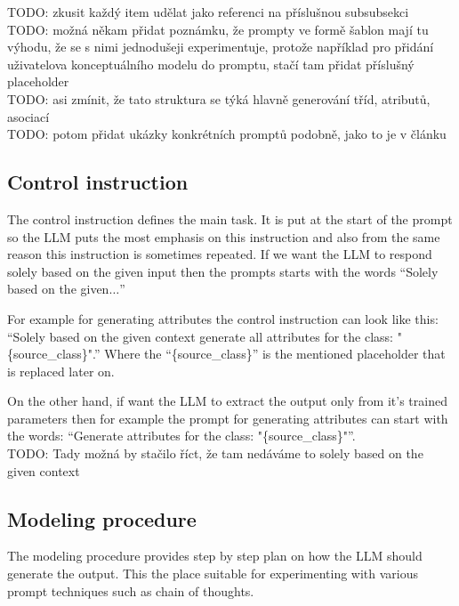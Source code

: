 TODO: zkusit každý item udělat jako referenci na příslušnou subsubsekci \\

TODO: možná někam přidat poznámku, že prompty ve formě šablon mají tu výhodu, že se s nimi jednodušeji experimentuje, protože například pro přidání uživatelova konceptuálního modelu do promptu, stačí tam přidat příslušný placeholder \\

TODO: asi zmínit, že tato struktura se týká hlavně generování tříd, atributů, asociací \\

TODO: potom přidat ukázky konkrétních promptů podobně, jako to je v článku \\


\subsection{Control instruction}
The control instruction defines the main task. It is put at the start of the prompt so the LLM puts the most emphasis on this instruction and also from the same reason this instruction is sometimes repeated. If we want the LLM to respond solely based on the given input then the prompts starts with the words ``Solely based on the given$\ldots$''

For example for generating attributes the control instruction can look like this:
``Solely based on the given context generate all attributes for the class: "\{source\_class\}".'' Where the ``\{source\_class\}'' is the mentioned placeholder that is replaced later on.

On the other hand, if want the LLM to extract the output only from it's trained parameters then for example the prompt for generating attributes can start with the words: ``Generate attributes for the class: "\{source\_class\}"''. \\

TODO: Tady možná by stačilo říct, že tam nedáváme to solely based on the given context \\


\subsection{Modeling procedure}
The modeling procedure provides step by step plan on how the LLM should generate the output. This the place suitable for experimenting with various prompt techniques such as chain of thoughts. \\

